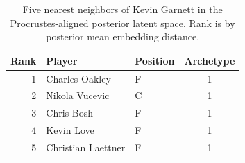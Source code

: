 \begin{table}[htbp]
  \centering\small
  \begin{tabular}{rllc}
    \toprule
    Rank & Player & Position & Archetype \\
    \midrule
    1 & Charles Oakley & F & 1 \\
    2 & Nikola Vucevic & C & 1 \\
    3 & Chris Bosh & F & 1 \\
    4 & Kevin Love & F & 1 \\
    5 & Christian Laettner & F & 1 \\
    \bottomrule
  \end{tabular}
  \caption{Five nearest neighbors of Kevin Garnett in the Procrustes-aligned posterior latent space. Rank is by posterior mean embedding distance.}
  \label{tab:Kevin_Garnett_neighbors}
\end{table}

